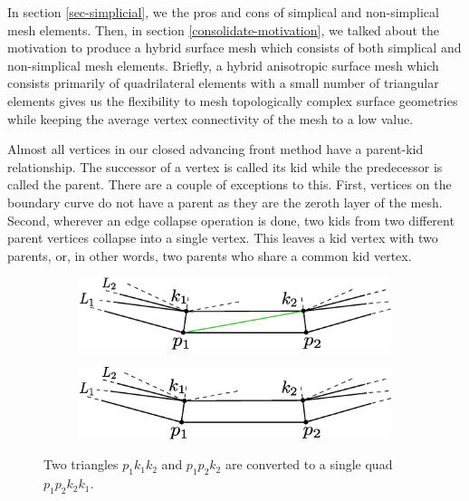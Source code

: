 In section \ref{sec-simplicial}, we the pros and cons of simplical and non-simplical mesh elements. Then, in section \ref{consolidate-motivation}, we talked about the motivation to produce a hybrid surface mesh which consists of both simplical and non-simplical mesh elements. Briefly, a hybrid anisotropic surface mesh which consists primarily of quadrilateral elements with a small number of triangular elements gives us the flexibility to mesh topologically complex surface geometries while keeping the average vertex connectivity of the mesh to a low value.

Almost all vertices in our closed advancing front method have a parent-kid relationship. The successor of a vertex is called its kid while the predecessor is called the parent. There are a couple of exceptions to this. First, vertices on the boundary curve do not have a parent as they are the zeroth layer of the mesh. Second, wherever an edge collapse operation is done, two kids from two different parent vertices collapse into a single vertex. This leaves a kid vertex with two parents, or, in other words, two parents who share a common kid vertex.

\vspace{10pt}
\begin{figure}[hbt!]
\centering
\begin{subfigure}{\textwidth}
  \centering
  \includegraphics[width=.7\linewidth]{img/m2/combineTriToQuad.eps}
  \caption{}
  \label{triToQuad1}
\end{subfigure}
\begin{subfigure}{\textwidth}
  \centering
  \includegraphics[width=.7\linewidth]{img/m2/combineTriToQuad2.eps}
  \caption{}
  \label{triToQuad2}
\end{subfigure}
\caption[Combining tris to quads]{Two triangles $\mathit{p_1k_1k_2}$ and $p_1p_2k_2$ are converted to a single quad $\mathit{p_1p_2k_2k_1}$.}
\label{triToQuad}
\end{figure}


